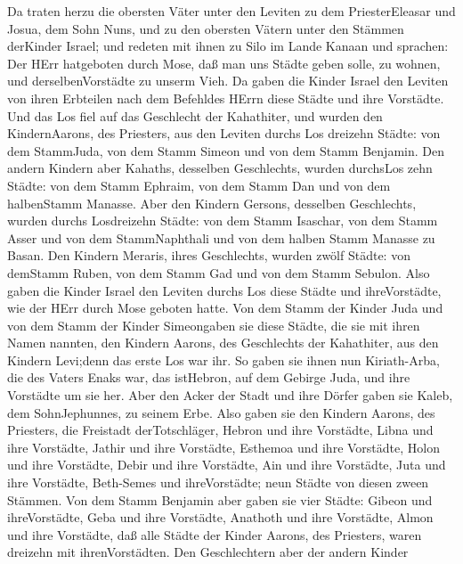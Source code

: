  Da traten herzu die obersten Väter unter den Leviten zu dem
PriesterEleasar und Josua, dem Sohn Nuns, und zu den obersten Vätern
unter den Stämmen derKinder Israel;  und redeten mit ihnen
zu Silo im Lande Kanaan und sprachen: Der HErr hatgeboten durch Mose,
daß man uns Städte geben solle, zu wohnen, und derselbenVorstädte zu
unserm Vieh.  Da gaben die Kinder Israel den Leviten von
ihren Erbteilen nach dem Befehldes HErrn diese Städte und ihre
Vorstädte.  Und das Los fiel auf das Geschlecht der
Kahathiter, und wurden den KindernAarons, des Priesters, aus den Leviten
durchs Los dreizehn Städte: von dem StammJuda, von dem Stamm Simeon und
von dem Stamm Benjamin.  Den andern Kindern aber Kahaths,
desselben Geschlechts, wurden durchsLos zehn Städte: von dem Stamm
Ephraim, von dem Stamm Dan und von dem halbenStamm Manasse. 
Aber den Kindern Gersons, desselben Geschlechts, wurden durchs
Losdreizehn Städte: von dem Stamm Isaschar, von dem Stamm Asser und von
dem StammNaphthali und von dem halben Stamm Manasse zu Basan.
 Den Kindern Meraris, ihres Geschlechts, wurden zwölf
Städte: von demStamm Ruben, von dem Stamm Gad und von dem Stamm Sebulon.
 Also gaben die Kinder Israel den Leviten durchs Los diese
Städte und ihreVorstädte, wie der HErr durch Mose geboten hatte.
 Von dem Stamm der Kinder Juda und von dem Stamm der Kinder
Simeongaben sie diese Städte, die sie mit ihren Namen nannten,
 den Kindern Aarons, des Geschlechts der Kahathiter, aus
den Kindern Levi;denn das erste Los war ihr.  So gaben sie
ihnen nun Kiriath-Arba, die des Vaters Enaks war, das istHebron, auf dem
Gebirge Juda, und ihre Vorstädte um sie her.  Aber den
Acker der Stadt und ihre Dörfer gaben sie Kaleb, dem SohnJephunnes, zu
seinem Erbe.  Also gaben sie den Kindern Aarons, des
Priesters, die Freistadt derTotschläger, Hebron und ihre Vorstädte,
Libna und ihre Vorstädte,  Jathir und ihre Vorstädte,
Esthemoa und ihre Vorstädte,  Holon und ihre Vorstädte,
Debir und ihre Vorstädte,  Ain und ihre Vorstädte, Juta und
ihre Vorstädte, Beth-Semes und ihreVorstädte; neun Städte von diesen
zween Stämmen.  Von dem Stamm Benjamin aber gaben sie vier
Städte: Gibeon und ihreVorstädte, Geba und ihre Vorstädte, 
Anathoth und ihre Vorstädte, Almon und ihre Vorstädte,  daß
alle Städte der Kinder Aarons, des Priesters, waren dreizehn mit
ihrenVorstädten.  Den Geschlechtern aber der andern Kinder
